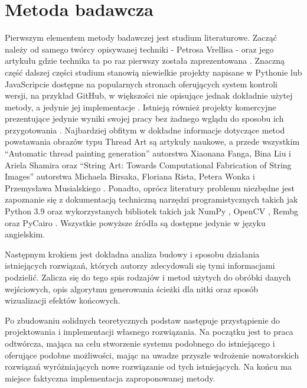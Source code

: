 \documentclass[a4paper, 12pt, polish, twoside]{extreport}
\begin{document}
    \section{Metoda badawcza} \label{intro-method}
    Pierwszym elementem metody badawczej jest studium literaturowe. Zacząć należy od samego twórcy opisywanej techniki - Petrosa Vrellisa - oraz jego artykułu gdzie technika ta po raz pierwszy została zaprezentowana \cite{new-way-to-knit}. Znaczną część dalszej części studium stanowią niewielkie projekty napisane w Pythonie lub JavaScripcie dostępne na popularnych stronach oferujących system kontroli wersji, na przykład GitHub, w większości nie opisujące jednak dokładnie użytej metody, a jedynie jej implementacje \cite{callum-github} \cite{jenny-github}. Istnieją również projekty komercyjne prezentujące jedynie wyniki swojej pracy bez żadnego wglądu do sposobu ich przygotowania \cite{artrapid}. Najbardziej obfitym w dokładne informacje dotyczące metod powstawania obrazów typu Thread Art są artykuły naukowe, a przede wszystkim ``Automatic thread painting generation'' autorstwa Xiaonana Fanga, Bina Liu i Ariela Shamira \cite{article-string-art-xiaonan} oraz ``String Art: Towards Computational Fabrication of String Images'' autorstwa Michaela Birsaka, Floriana Rista, Petera Wonka i Przemysława Musialskiego \cite{article-string-art-birsak}. Ponadto, oprócz literatury problemu niezbędne jest zapoznanie się z dokumentacją techniczną narzędzi programistycznych takich jak Python 3.9 \cite{python39} oraz wykorzystanych bibliotek takich jak NumPy \cite{numpy}, OpenCV \cite{opencv}, Rembg \cite{rembg} oraz PyCairo \cite{pycairo}. Wszystkie powyższe źródła są dostępne jedynie w języku angielskim. 
    
    Następnym krokiem jest dokładna analiza budowy i sposobu działania istniejących rozwiązań, których autorzy zdecydowali się tymi informacjami podzielić. Zalicza się do tego spis rodzajów i metod użytych do obróbki danych wejściowych, opis algorytmu generowania ścieżki dla nitki oraz sposób wizualizacji efektów końcowych.
    
    Po zbudowaniu solidnych teoretycznych podstaw następuje przystąpienie do projektowania i implementacji własnego rozwiązania. Na początku jest to praca odtwórcza, mająca na celu stworzenie systemu podobnego do istniejącego i oferujące podobne możliwości, mając na uwadze przyszłe wdrożenie nowatorskich rozwiązań wyróżniających nowe rozwiązanie od tych istniejących. Na końcu ma miejsce faktyczna implementacja zaproponowanej metody.
    
\end{document}
